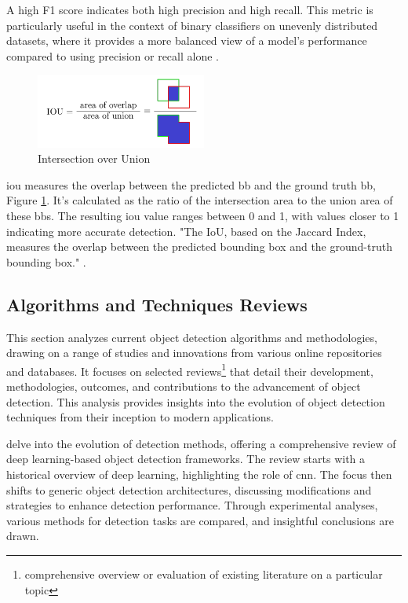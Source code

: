 A high F1 score indicates both high precision and high recall. This metric is particularly useful in the context of binary classifiers on unevenly distributed datasets, where it provides a more balanced view of a model's performance compared to using precision or recall alone \cite{rfc9}.

\begin{figure}[h]
    \centering 
    \includegraphics[width=0.5\textwidth]{figs/iou.png} 
    \caption{Intersection over Union \cite{rfc25}}
    \label{fig:iou}
\end{figure}

\ac{iou} measures the overlap between the predicted \ac{bb} and the ground truth \ac{bb}, Figure \ref{fig:iou}. It's calculated as the ratio of the intersection area to the union area of these \ac{bb}s. The resulting \ac{iou} value ranges between 0 and 1, with values closer to 1 indicating more accurate detection. "The IoU, based on the Jaccard Index, measures the overlap between the predicted bounding box and the ground-truth bounding box." \cite{rfc24}.

\subsection{Algorithms and Techniques Reviews}
This section analyzes current object detection algorithms and methodologies, drawing on a range of studies and 
innovations from various online repositories and databases. It focuses on selected 
reviews\footnote{comprehensive overview or evaluation of existing literature on a particular topic} 
that detail their development, methodologies, outcomes, and contributions to the advancement of object 
detection. This analysis provides insights into the evolution of object detection techniques from their 
inception to modern applications.

\citet{rfc2} delve into the evolution of detection methods, offering a comprehensive review 
of deep learning-based object detection frameworks. The review starts with a historical overview of deep learning, 
highlighting the role of \ac{cnn}. The focus then shifts to generic object detection architectures, discussing 
modifications and strategies to enhance detection performance. Through experimental analyses, various methods 
for detection tasks are compared, and insightful conclusions are drawn.

